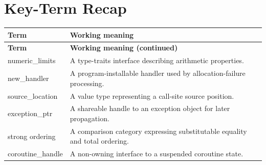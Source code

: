 \documentclass[11pt,letterpaper]{article}
\begin{document}
\section{Key-Term Recap}
\begin{longtable}{@{}>{\RaggedRight\arraybackslash}p{}>{\RaggedRight\arraybackslash}p{}@{}}\toprule\textbf{Term} & \textbf{Working meaning}\\\midrule\endfirsthead\toprule\textbf{Term} & \textbf{Working meaning (continued)}\\\midrule\endhead\bottomrule\endfoot
numeric\_\allowbreak{}limits & A type-traits interface describing arithmetic properties.\\
new\_\allowbreak{}handler & A program-installable handler used by allocation-failure processing.\\
source\_\allowbreak{}location & A value type representing a call-site source position.\\
exception\_\allowbreak{}ptr & A shareable handle to an exception object for later propagation.\\
strong ordering & A comparison category expressing substitutable equality and total ordering.\\
coroutine\_\allowbreak{}handle & A non-owning interface to a suspended coroutine state.\\
\end{longtable}
\end{document}
